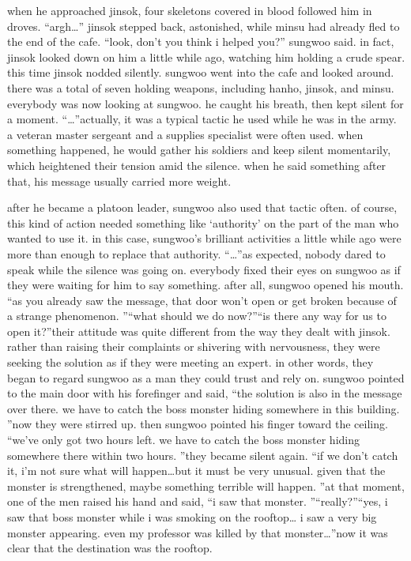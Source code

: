  when he approached jinsok, four skeletons covered in blood followed him in droves.
“argh…” jinsok stepped back, astonished, while minsu had already fled to the end of the cafe.
“look, don’t you think i helped you?” sungwoo said.
in fact, jinsok looked down on him a little while ago, watching him holding a crude spear.
 this time jinsok nodded silently.
sungwoo went into the cafe and looked around.
 there was a total of seven holding weapons, including hanho, jinsok, and minsu.
everybody was now looking at sungwoo.
 he caught his breath, then kept silent for a moment.
“…”actually, it was a typical tactic he used while he was in the army.
 a veteran master sergeant and a supplies specialist were often used.
 when something happened, he would gather his soldiers and keep silent momentarily, which heightened their tension amid the silence.
 when he said something after that, his message usually carried more weight.


after he became a platoon leader, sungwoo also used that tactic often.
 of course, this kind of action needed something like ‘authority’ on the part of the man who wanted to use it.
 in this case, sungwoo’s brilliant activities a little while ago were more than enough to replace that authority.
“…”as expected, nobody dared to speak while the silence was going on.
 everybody fixed their eyes on sungwoo as if they were waiting for him to say something.
after all, sungwoo opened his mouth.
“as you already saw the message, that door won’t open or get broken because of a strange phenomenon.
”“what should we do now?”“is there any way for us to open it?”their attitude was quite different from the way they dealt with jinsok.
 rather than raising their complaints or shivering with nervousness, they were seeking the solution as if they were meeting an expert.
 in other words, they began to regard sungwoo as a man they could trust and rely on.
sungwoo pointed to the main door with his forefinger and said, “the solution is also in the message over there.
 we have to catch the boss monster hiding somewhere in this building.
”now they were stirred up.
 then sungwoo pointed his finger toward the ceiling.
“we’ve only got two hours left.
 we have to catch the boss monster hiding somewhere there within two hours.
”they became silent again.
“if we don’t catch it, i’m not sure what will happen…but it must be very unusual.
 given that the monster is strengthened, maybe something terrible will happen.
”at that moment, one of the men raised his hand and said, “i saw that monster.
”“really?”“yes, i saw that boss monster while i was smoking on the rooftop… i saw a very big monster appearing.
 even my professor was killed by that monster…”now it was clear that the destination was the rooftop.


 